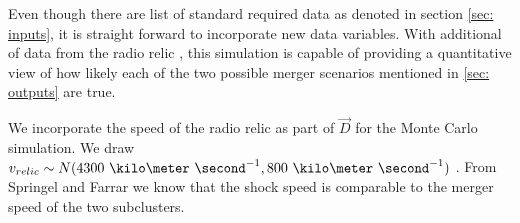 \label{sec: positionprior}
Even though there are list of standard required data as denoted in section
\ref{sec: inputs}, it is straight forward to incorporate new data variables.
With additional of data from the radio relic \citep{L13}, this simulation is
capable of providing a quantitative view of how likely each of 
 the two possible merger scenarios mentioned in \ref{sec: outputs} are true. 

We incorporate the speed of the radio relic as part of $\vec{D}$ for the
Monte Carlo simulation.
We draw  $v_{relic} \sim N(4300~\kilo\meter~\second^{-1}, 800
~\kilo\meter~\second^{-1})$ \citep{L13}. 
From Springel and Farrar we know that the shock speed is comparable to the
merger speed of the two subclusters.
\par      

